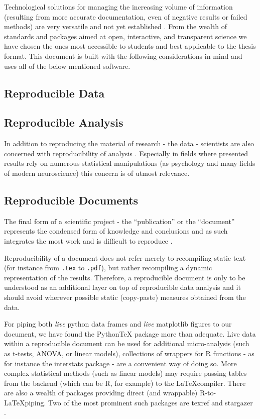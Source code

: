 	Technological solutions for managing the increasing volume of information (resulting from more accurate documentation, even of negative results or failed methods) are very versatile and not yet established \cite{Akerman2006}.
	From the wealth of standards and packages aimed at open, interactive, and transparent science we have chosen the ones most accessible to students and best applicable to the thesis format.
	This document is built with the following considerations in mind and uses all of the below mentioned software.
	\subsection{Reproducible Data}\label{sec:b_rr}
	    
	\subsection{Reproducible Analysis}\label{sec:b_ra}
	    In addition to reproducing the material of research - the data - scientists are also concerned with reproducibility of analysis \cite{Peng2009}.
	    Especially in fields where presented results rely on numerous statistical manipulations (as psychology and many fields of modern neuroscience) this concern is of utmost relevance.
	    	    
	\subsection{Reproducible Documents}\label{sec:b_rd}
	    The final form of a scientific project - the “publication” or the “document” represents the condensed form of knowledge and conclusions and as such integrates the most work and is difficult to reproduce \cite{Schwab2000}.
	    
	    Reproducibility of a document does not refer merely to recompiling static text (for instance from \colorbox{vlg}{\texttt{.tex}} to \colorbox{vlg}{\texttt{.pdf}}), but rather recompiling a dynamic representation of the results.
	    Therefore, a reproducible document is only to be understood as an additional layer on top of reproducible data analysis and it should avoid wherever possible static (copy-paste) measures obtained from the data. 
	    
	    For piping both \textit{live} python data frames and \textit{live} matplotlib figures to our document, we have found the PythonTeX \cite{Poore2013} package more than adequate.
	    Live data within a reproducible document can be used for additional micro-analysis (such as t-tests, ANOVA, or linear models), collections of wrappers for R functions - as for instance the interstats package \cite{interstats} - are a convenient way of doing so.
	    More complex statistical methods (such as linear models) may require passing tables from the backend (which can be R\cite{R}, for example) to the \LaTeX compiler.
	    There are also a wealth of packages providing direct (and wrappable) R-to-\LaTeX piping.
	    Two of the most prominent such packages are texref \cite{Leifeld2013} and stargazer \cite{Hlavac2013}.
